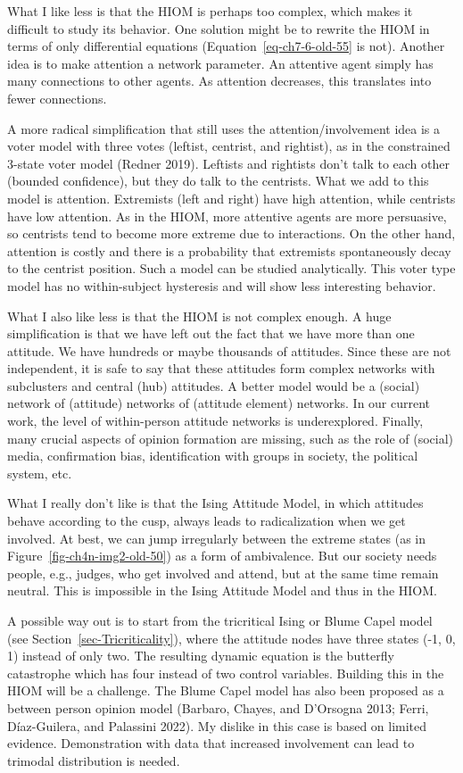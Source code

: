 \documentclass[
  a4paper,
  DIV=11,
  numbers=noendperiod]{scrreprt}
\begin{document}
What I like less is that the HIOM is perhaps too complex, which makes it
difficult to study its behavior. One solution might be to rewrite the
HIOM in terms of only differential equations
(Equation~\ref{eq-ch7-6-old-55} is not). Another idea is to make
attention a network parameter. An attentive agent simply has many
connections to other agents. As attention decreases, this translates
into fewer connections.

A more radical simplification that still uses the attention/involvement
idea is a voter model with three votes (leftist, centrist, and
rightist), as in the constrained 3-state voter model (Redner 2019).
Leftists and rightists don't talk to each other (bounded confidence),
but they do talk to the centrists. What we add to this model is
attention. Extremists (left and right) have high attention, while
centrists have low attention. As in the HIOM, more attentive agents are
more persuasive, so centrists tend to become more extreme due to
interactions. On the other hand, attention is costly and there is a
probability that extremists spontaneously decay to the centrist
position. Such a model can be studied analytically. This voter type
model has no within-subject hysteresis and will show less interesting
behavior.

What I also like less is that the HIOM is not complex enough. A huge
simplification is that we have left out the fact that we have more than
one attitude. We have hundreds or maybe thousands of attitudes. Since
these are not independent, it is safe to say that these attitudes form
complex networks with subclusters and central (hub) attitudes. A better
model would be a (social) network of (attitude) networks of (attitude
element) networks. In our current work, the level of within-person
attitude networks is underexplored. Finally, many crucial aspects of
opinion formation are missing, such as the role of (social) media,
confirmation bias, identification with groups in society, the political
system, etc.

What I really don't like is that the Ising Attitude Model, in which
attitudes behave according to the cusp, always leads to radicalization
when we get involved. At best, we can jump irregularly between the
extreme states (as in Figure~\ref{fig-ch4n-img2-old-50}) as a form of
ambivalence. But our society needs people, e.g., judges, who get
involved and attend, but at the same time remain neutral. This is
impossible in the Ising Attitude Model and thus in the HIOM.

A possible way out is to start from the tricritical Ising or Blume Capel
model (see Section~\ref{sec-Tricriticality}), where the attitude nodes
have three states (-1, 0, 1) instead of only two. The resulting dynamic
equation is the butterfly catastrophe which has four instead of two
control variables. Building this in the HIOM will be a challenge. The
Blume Capel model has also been proposed as a between person opinion
model (Barbaro, Chayes, and D'Orsogna 2013; Ferri, Díaz-Guilera, and
Palassini 2022). My dislike in this case is based on limited evidence.
Demonstration with data that increased involvement can lead to trimodal
distribution is needed.
\end{document}

